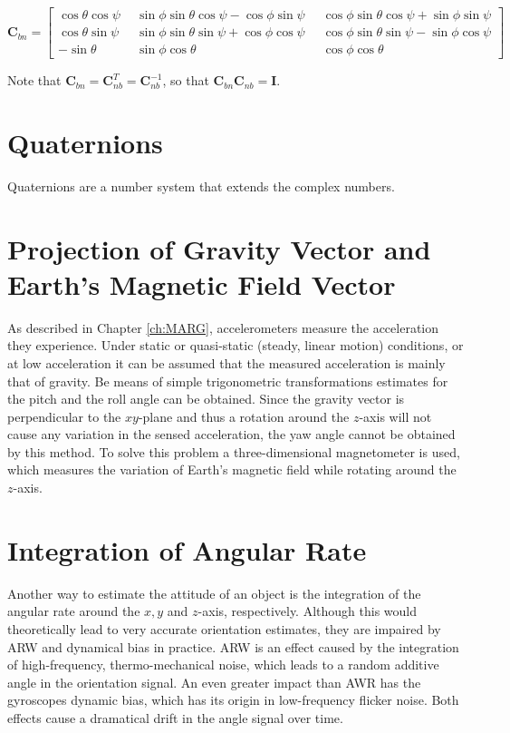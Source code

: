 \begin{equation}
\mathbf{C}_{bn} = {\left[\begin{smallmatrix}
   \cos \theta \cos \psi \; &
    \sin \phi \sin \theta \cos \psi - \cos \phi \sin \psi \; &
    \cos \phi \sin \theta \cos \psi + \sin \phi \sin \psi \\
    \cos \theta \sin \psi \;\; &
    \sin \phi \sin \theta \sin \psi + \cos \phi \cos \psi \;\; &
    \cos \phi \sin \theta \sin \psi - \sin \phi \cos \psi \\
    -\sin \theta \;\; &
    \sin \phi \cos \theta \;\; &
    \cos \phi \cos \theta
  \end{smallmatrix}\right]}
\end{equation}

\noindent
Note that $\mathbf{C}_{bn} = \mathbf{C}^T_{nb} = \mathbf{C}^{-1}_{nb}$, so that $\mathbf{C}^{ }_{bn} \mathbf{C}_{nb} = \mathbf{I}$.  

\section{Quaternions}

Quaternions are a number system that extends the complex numbers. 

\section{Projection of Gravity Vector and Earth's Magnetic Field Vector}

As described in Chapter \ref{ch:MARG}, accelerometers measure the acceleration they experience. Under static or quasi-static (steady, linear motion) conditions, or at low acceleration it can be assumed that the measured acceleration is mainly that of gravity. Be means of simple trigonometric transformations estimates for the pitch and the roll angle can be obtained. Since the gravity vector is perpendicular to the $xy$-plane and thus a rotation around the $z$-axis will not cause any variation in the sensed acceleration, the yaw angle cannot be obtained by this method. To solve this problem a three-dimensional magnetometer is used, which measures the variation of Earth's magnetic field while rotating around the $z$-axis.

\section{Integration of Angular Rate}

Another way to estimate the attitude of an object is the integration of the angular rate around the $x, y$ and $z$-axis, respectively. Although this would theoretically lead to very accurate orientation estimates, they are impaired by \gls{ARW} and dynamical bias in practice. \gls{ARW} is an effect caused by the integration of high-frequency, thermo-mechanical noise, which leads to a random additive angle in the orientation signal. An even greater impact than AWR has the gyroscopes dynamic bias, which has its origin in low-frequency flicker noise. Both effects cause a dramatical drift in the angle signal over time.

